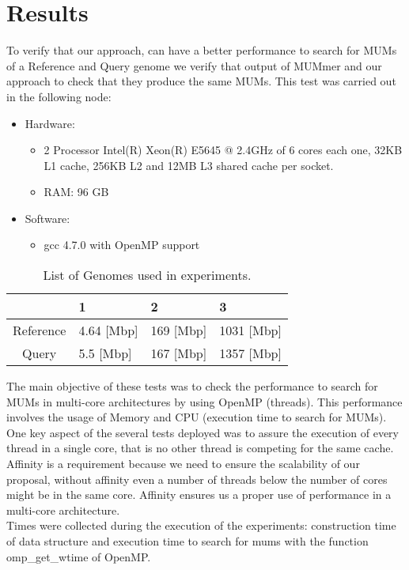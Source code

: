 \documentclass{acm_proc_article-sp}
\begin{document}
\section{Results}
To verify that our approach, can have a better performance to search for MUMs of a Reference and Query genome we verify that output of MUMmer and our approach to check that they produce the same MUMs. This test was carried out in the following node:
\begin{itemize}
\item Hardware:  
\begin{itemize}
\item 2 Processor Intel(R) Xeon(R) E5645 @ 2.4GHz of 6 cores each one, 32KB L1 cache, 256KB L2 and 12MB L3 shared cache per socket.
\item RAM: 96 GB
\end{itemize} 
\item  Software: 
\begin{itemize}
\item gcc 4.7.0 with OpenMP support
\end{itemize}  
\end{itemize}
\begin{table}
\centering
\caption{List of Genomes used in experiments.}
\label{genomes}
\begin{tabular}{|c|l|l|l|} \hline
  & 1 & 2 & 3 \\ \hline
  Reference & 4.64 [Mbp] & 169 [Mbp] & 1031 [Mbp] \\ \hline
  Query & 5.5 [Mbp] & 167 [Mbp] & 1357 [Mbp] \\ 
  \hline
\end{tabular}
\end{table}
The main objective of these tests was to check the performance to search for MUMs in multi-core architectures by using OpenMP (threads). This performance involves the usage of Memory and CPU (execution time to search for MUMs).\\
One key aspect of the several tests deployed was to assure the execution of every thread in a single core, that is no other thread is competing for the same cache. Affinity is a requirement because we need to ensure the scalability of our proposal, without affinity even a number of threads below the number of cores might be in the same core. Affinity ensures us a proper use of performance in a multi-core architecture.\\
Times were collected during the execution of the experiments: construction time of data structure and execution time to search for mums with the function omp\_get\_wtime of OpenMP.\\
\end{document}

